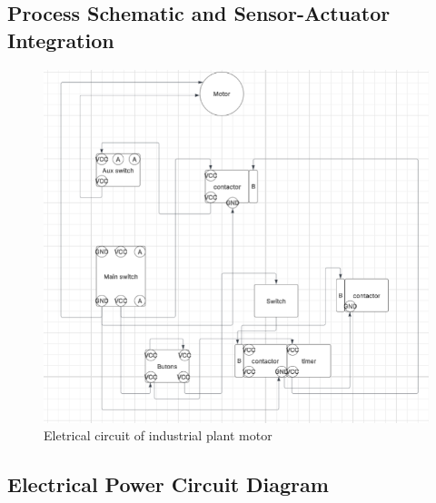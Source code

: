 \subsection{Process Schematic and Sensor-Actuator Integration} \label{sec:Process_Schematic_and_Sensor-Actuator_Integration}

\begin{figure}[H]
    \includegraphics[width=16cm]{Images/Q2/eletrical_circuit.png}
    \centering
    \caption{Eletrical circuit of industrial plant motor}
    \label{fig:eletrical_circuit}
\end{figure}

\subsection{Electrical Power Circuit Diagram} \label{sec:Electrical_Power_Circuit_Diagram}

